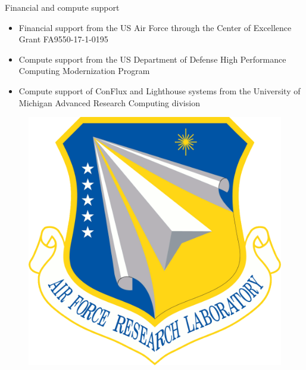 \documentclass[]{beamer}
\begin{document}
\begin{frame}{Financial and compute support}
	\begin{itemize}
	    \item Financial support from the US Air Force through the Center of Excellence Grant FA9550-17-1-0195
	    \item Compute support from the US Department of Defense High Performance Computing Modernization Program
		\item Compute support of ConFlux and Lighthouse systems from the University of Michigan Advanced Research Computing division
	\end{itemize}
	\begin{minipage}{0.15\linewidth}
		\vspace{0.5em}
		\begin{figure}
			\includegraphics[width=0.99\linewidth]{back_matter/afrlLogo.png}
		\end{figure}
	\end{minipage}
	\begin{minipage}{0.34\linewidth}
		\begin{figure}

\end{figure}
\end{minipage}
\end{frame}
\end{document}
